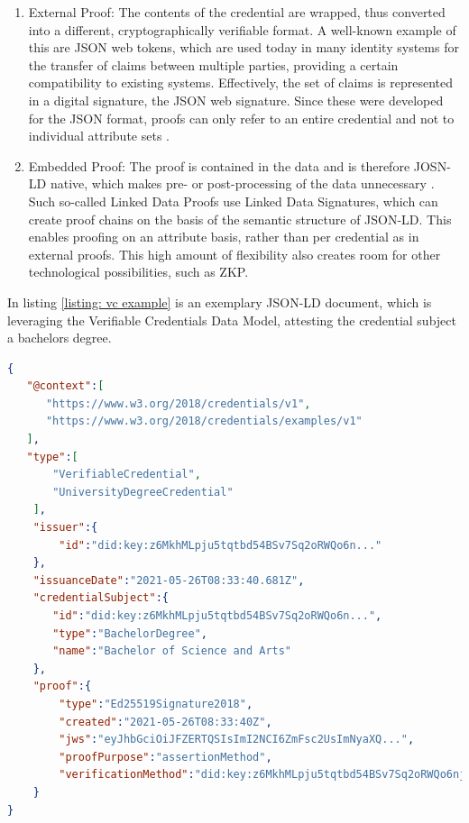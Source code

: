         \begin{enumerate}
            \item External Proof: The contents of the credential are wrapped, thus converted into a different, cryptographically verifiable format. A well-known example of this are JSON web tokens, which are used today in many identity systems for the transfer of claims between multiple parties, providing a certain compatibility to existing systems. Effectively, the set of claims is represented in a digital signature, the JSON web signature. Since these were developed for the JSON format, proofs can only refer to an entire credential and not to individual attribute sets \cite{helmy_jwt_2020}. \cite{sporny_verifiable_2019}

            \item Embedded Proof: The proof is contained in the data and is therefore JOSN-LD native, which makes pre- or post-processing of the data unnecessary \cite{sporny_verifiable_2019}. Such so-called Linked Data Proofs use Linked Data Signatures, which can create proof chains on the basis of the semantic structure of JSON-LD.  This enables proofing on an attribute basis, rather than per credential as in external proofs. This high amount of flexibility also creates room for other technological possibilities, such as \ac{ZKP}. \cite{helmy_jwt_2020}
        \end{enumerate}
        
        In listing \ref{listing: vc example} is an exemplary JSON-LD document, which is leveraging the Verifiable Credentials Data Model, attesting the credential subject a bachelors degree.
        \newline
        
        \begin{lstlisting}[language=json, caption={Example of a Bachelors degree as a Verifiable Credential}, captionpos=b, label={listing: vc example}]  
{
   "@context":[
      "https://www.w3.org/2018/credentials/v1",
      "https://www.w3.org/2018/credentials/examples/v1"
   ],
   "type":[
       "VerifiableCredential",
       "UniversityDegreeCredential"
    ],
    "issuer":{
        "id":"did:key:z6MkhMLpju5tqtbd54BSv7Sq2oRWQo6n..."
    },
    "issuanceDate":"2021-05-26T08:33:40.681Z",
    "credentialSubject":{
       "id":"did:key:z6MkhMLpju5tqtbd54BSv7Sq2oRWQo6n...",
       "type":"BachelorDegree",
       "name":"Bachelor of Science and Arts"
    },
    "proof":{
        "type":"Ed25519Signature2018",
        "created":"2021-05-26T08:33:40Z",
        "jws":"eyJhbGciOiJFZERTQSIsImI2NCI6ZmFsc2UsImNyaXQ...",
        "proofPurpose":"assertionMethod",
        "verificationMethod":"did:key:z6MkhMLpju5tqtbd54BSv7Sq2oRWQo6njMEywrbWAGAp3442#z6MkhM..."
    }
}\end{lstlisting}
	   
